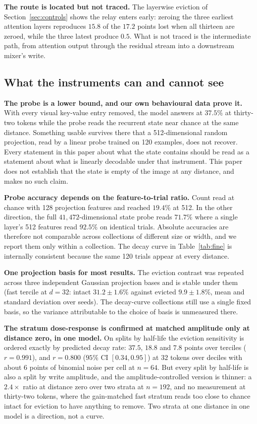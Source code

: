 \documentclass{article}
\begin{document}
\textbf{The route is located but not traced.} The layerwise eviction of
Section~\ref{sec:controls} shows the relay enters early: zeroing the three
earliest attention layers reproduces $15.8$ of the $17.2$ points lost when all
thirteen are zeroed, while the three latest produce $0.5$. What is not traced is
the intermediate path, from attention output through the residual stream into a
downstream mixer's write.

\subsection{What the instruments can and cannot see}

\textbf{The probe is a lower bound, and our own behavioural data prove it.}
With every visual key-value entry removed, the model answers at $37.5\%$ at
thirty-two tokens while the probe reads the recurrent state near chance at the
same distance. Something usable survives there that a 512-dimensional random
projection, read by a linear probe trained on 120 examples, does not recover.
Every statement in this paper about what the state contains should be read as a
statement about what is linearly decodable under that instrument. This paper does
not establish that the state is empty of the image at any distance, and makes no
such claim.

\textbf{Probe accuracy depends on the feature-to-trial ratio.} Count read at
chance with 128 projection features and reached $19.4\%$ at 512. In the other
direction, the full $41{,}472$-dimensional state probe reads $71.7\%$ where a
single layer's 512 features read $92.5\%$ on identical trials. Absolute
accuracies are therefore not comparable across collections of different size or
width, and we report them only within a collection. The decay curve in
Table~\ref{tab:fine} is internally consistent because the same 120 trials appear
at every distance.

\textbf{One projection basis for most results.} The eviction contrast was
repeated across three independent Gaussian projection bases and is stable under
them (fast tercile at $d{=}32$: intact $31.2 \pm 1.6\%$ against evicted
$9.9 \pm 1.8\%$, mean and standard deviation over seeds). The decay-curve
collections still use a single fixed basis, so the variance attributable to the
choice of basis is unmeasured there.

\textbf{The stratum dose-response is confirmed at matched amplitude only at
distance zero, in one model.} On splits by half-life the eviction sensitivity
is ordered exactly by predicted decay rate: $37.5$, $18.8$ and $7.8$ points
over terciles ($r = 0.991$), and $r = 0.800$ ($95\%$ CI $[0.34, 0.95]$) at
$32$ tokens over deciles with about $6$ points of binomial noise per cell at
$n = 64$. But every split by half-life is also a split by write amplitude, and
the amplitude-controlled version is thinner: a $2.4\times$ ratio at distance
zero over two strata at $n = 192$, and no measurement at thirty-two tokens,
where the gain-matched fast stratum reads too close to chance intact for
eviction to have anything to remove. Two strata at one distance in one model
is a direction, not a curve.
\end{document}
